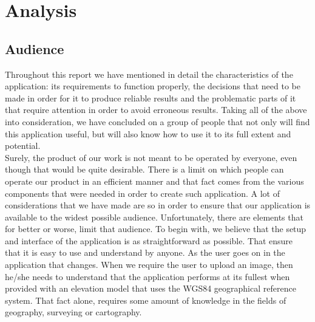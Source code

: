 
\chapter{Analysis} %

\label{ch:analysis} %




\section{Audience}

Throughout this report we have mentioned in detail the characteristics of the application: its requirements to function properly, the decisions that need to be made in order for it to produce reliable results and the problematic parts of it that require attention in order to avoid erroneous results. Taking all of the above into consideration, we have concluded on a group of people that not only will find this application useful, but will also know how to use it to its full extent and potential.\\
Surely, the product of our work is not meant to be operated by everyone, even though that would be quite desirable. There is a limit on which people can operate our product in an efficient manner and that fact comes from the various components that were needed in order to create such application. A lot of considerations that we have made are so in order to ensure that our application is available to the widest possible audience. Unfortunately, there are elements that for better or worse, limit that audience.
To begin with, we believe that the setup and interface of the application is as straightforward as possible. That ensure that it is easy to use and understand by anyone. As the user goes on in the application that changes. When we require the user to upload an image, then he/she needs to understand that the application performs at its fullest when provided with an elevation model that uses the WGS84 geographical reference system. That fact alone, requires some amount of knowledge in the fields of geography, surveying or cartography.\\

